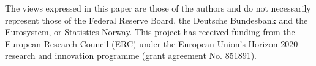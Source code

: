 \documentclass[HAFiscal]{subfiles}
\begin{document}

\newcommand{\thanksInput}[1]{%
  \IfFileExists{\econtexRoot/Subfiles/#1.tex}%
    {\ignorespaces\unskip}%
    {}%
  }%
  

\hypertarget{abstract}{}
\footnotesize The views expressed in this paper are those of the authors and do not necessarily represent those of the Federal Reserve Board, the Deutsche Bundesbank and the Eurosystem, or Statistics Norway. This project has received funding from the European Research Council (ERC) under the European Union's Horizon 2020 research and innovation programme (grant agreement No. 851891).



%



\titlepagefinish
\end{document}
